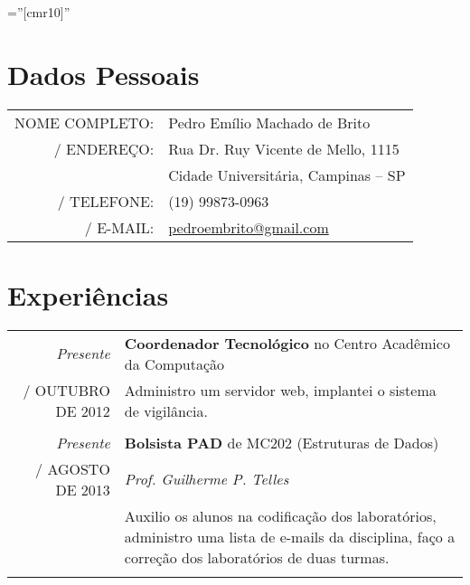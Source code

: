 \documentclass[a4paper,10pt]{article} %
\makeatletter
\def\fakesc#1{%
  \begingroup%
  \xdef\fake@name{\csname\curr@fontshape/\f@size\endcsname}%
  \fontsize{\fontdimen8\fake@name}{\baselineskip}\selectfont%
  \uppercase{#1}%
  \endgroup%
}
\renewcommand{\textsc}{\fakesc}
\makeatother
\begin{document}
\pagestyle{empty} %

\font\fb=''[cmr10]'' %


\par{\centering{\Huge Pedro \textsc{Brito}}\bigskip\par} %

\section{Dados Pessoais}

\begin{tabular}{rl}
  \textsc{Nome Completo:} & Pedro Emílio Machado de Brito\\
  \textsc{Endereço:} & Rua Dr. Ruy Vicente de Mello, 1115\\
  & Cidade Universitária, Campinas -- SP \\
  \textsc{Telefone:} & (19) 99873-0963\\
  \textsc{E-mail:} & \href{mailto:pedroembrito@gmail.com}{pedroembrito@gmail.com}
\end{tabular}


\section{Experiências}

\begin{tabular}{r|p{11cm}}
  \emph{Presente} & \textbf{Coordenador Tecnológico} no Centro Acadêmico da Computação \\
 \textsc{Outubro de 2012} & \footnotesize{Administro um servidor web, implantei o sistema de vigilância.}\\
\multicolumn{2}{c}{} \\

\emph{Presente} & \textbf{Bolsista PAD} de MC202 (Estruturas de Dados)\\
\textsc{Agosto de 2013} &  \emph{Prof. Guilherme P. Telles}\\
& \footnotesize {Auxilio os alunos na codificação dos laboratórios, administro uma lista de e-mails da disciplina, faço a correção dos laboratórios de duas turmas.}\\
\multicolumn{2}{c}{}\\

\end{tabular}
\end{document}
